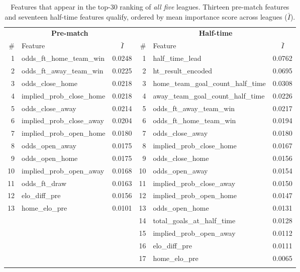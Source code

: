 \documentclass[pdflatex,sn-mathphys-num]{sn-jnl}
\theoremstyle{thmstyleone}
\theoremstyle{thmstyletwo}
\theoremstyle{thmstylethree}
\begin{document}
\begin{table}[h]
\caption{Features that appear in the top-30 ranking of \emph{all five}
leagues. Thirteen pre-match features and seventeen half-time features
qualify, ordered by mean importance score across leagues
($\bar I$).}\label{tab:fi-universal}
\begin{tabular*}{\textwidth}{@{\extracolsep\fill}rlc|rlc@{}}
\toprule
\multicolumn{3}{c|}{\textbf{Pre-match}} & \multicolumn{3}{c}{\textbf{Half-time}} \\
\# & Feature & $\bar I$ & \# & Feature & $\bar I$ \\
\midrule
1  & odds\_ft\_home\_team\_win      & 0.0248 & 1  & half\_time\_lead                     & 0.0762 \\
2  & odds\_ft\_away\_team\_win      & 0.0225 & 2  & ht\_result\_encoded                  & 0.0695 \\
3  & odds\_close\_home              & 0.0218 & 3  & home\_team\_goal\_count\_half\_time   & 0.0308 \\
4  & implied\_prob\_close\_home     & 0.0218 & 4  & away\_team\_goal\_count\_half\_time   & 0.0226 \\
5  & odds\_close\_away              & 0.0214 & 5  & odds\_ft\_away\_team\_win            & 0.0217 \\
6  & implied\_prob\_close\_away     & 0.0204 & 6  & odds\_ft\_home\_team\_win            & 0.0194 \\
7  & implied\_prob\_open\_home      & 0.0180 & 7  & odds\_close\_away                   & 0.0180 \\
8  & odds\_open\_away               & 0.0175 & 8  & implied\_prob\_close\_home           & 0.0167 \\
9  & odds\_open\_home               & 0.0175 & 9  & odds\_close\_home                   & 0.0156 \\
10 & implied\_prob\_open\_away      & 0.0168 & 10 & odds\_open\_away                    & 0.0154 \\
11 & odds\_ft\_draw                 & 0.0163 & 11 & implied\_prob\_close\_away           & 0.0150 \\
12 & elo\_diff\_pre                 & 0.0156 & 12 & implied\_prob\_open\_home            & 0.0147 \\
13 & home\_elo\_pre                 & 0.0101 & 13 & odds\_open\_home                    & 0.0131 \\
   &                                &        & 14 & total\_goals\_at\_half\_time          & 0.0128 \\
   &                                &        & 15 & implied\_prob\_open\_away            & 0.0112 \\
   &                                &        & 16 & elo\_diff\_pre                      & 0.0111 \\
   &                                &        & 17 & home\_elo\_pre                      & 0.0065 \\
\botrule
\end{tabular*}
\end{table}
\end{document}
